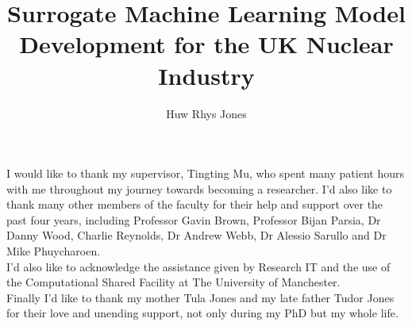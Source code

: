 \documentclass[12pt,PhD,wordcount,anon]{muthesis}
\begin{document}

\title{Surrogate Machine Learning Model Development for the UK Nuclear Industry}
\author{Huw Rhys Jones}

\beforeabstract



\afterabstract

I would like to thank my supervisor, Tingting Mu, who spent many patient hours with me throughout my journey towards becoming a researcher. I'd also like to thank many other members of the faculty for their help and support over the past four years, including Professor Gavin Brown, Professor Bijan Parsia, Dr Danny Wood, Charlie Reynolds, Dr Andrew Webb, Dr Alessio Sarullo and Dr Mike Phuycharoen. 
\\

\noindent
I'd also like to acknowledge the assistance
given by Research IT and the use of the Computational
Shared Facility at The University of Manchester.
\\

\noindent
Finally I'd like to thank my mother Tula Jones and my late father Tudor Jones for their love and unending support, not only during my PhD but my whole life.
\afterpreface




%








\end{document}
